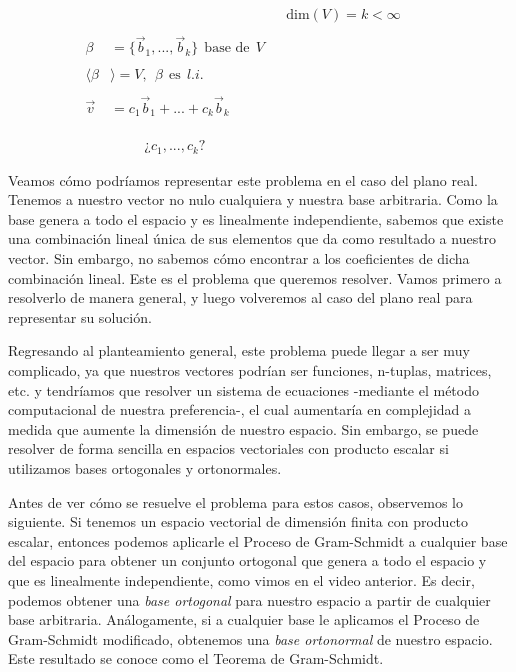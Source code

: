 \documentclass[12pt,dvipsnames]{article}
\numberwithin{equation}{section}
\begin{document}
\begin{align*}
    & & &\text{dim}(V)=k<\infty& & &\\
    \\
    \beta&=\{\vec{b}_1,...,\vec{b}_k\} \ \ \text{base de} \ \ V& & & & &\\
    \\
    \langle\beta&\rangle = V, \ \ \beta \ \ \text{es} \ \ l.i.& & & & & \\
    \\
    \vec{v}&= c_1\vec{b}_1 + ... + c_k\vec{b}_k& & & & & \\
    \\
    \\
    \\
    & \quad \quad \ \ \text{¿}c_1,...,c_k\text{?} & & & & &
\end{align*}

Veamos cómo podríamos representar este problema en el caso del plano real. Tenemos a nuestro vector no nulo cualquiera y nuestra base arbitraria. Como la base genera a todo el espacio y es linealmente independiente, sabemos que existe una combinación lineal única de sus elementos que da como resultado a nuestro vector. Sin embargo, no sabemos cómo encontrar a los coeficientes de dicha combinación lineal. Este es el problema que queremos resolver. Vamos primero a resolverlo de manera general, y luego volveremos al caso del plano real para representar su solución.

Regresando al planteamiento general, este problema puede llegar a ser muy complicado, ya que nuestros vectores podrían ser funciones, n-tuplas, matrices, etc. y tendríamos que resolver un sistema de ecuaciones -mediante el método computacional de nuestra preferencia-, el cual aumentaría en complejidad a medida que aumente la dimensión de nuestro espacio. Sin embargo, se puede resolver de forma sencilla en espacios vectoriales con producto escalar si utilizamos bases ortogonales y ortonormales.

Antes de ver cómo se resuelve el problema para estos casos, observemos lo siguiente. Si tenemos un espacio vectorial de dimensión finita con producto escalar, entonces podemos aplicarle el Proceso de Gram-Schmidt a cualquier base del espacio para obtener un conjunto ortogonal que genera a todo el espacio y que es linealmente independiente, como vimos en el video anterior. Es decir, podemos obtener una \emph{base ortogonal} para nuestro espacio a partir de cualquier base arbitraria. Análogamente, si a cualquier base le aplicamos el Proceso de Gram-Schmidt modificado, obtenemos una \emph{base ortonormal} de nuestro espacio. Este resultado se conoce como el Teorema de Gram-Schmidt.
\end{document}
